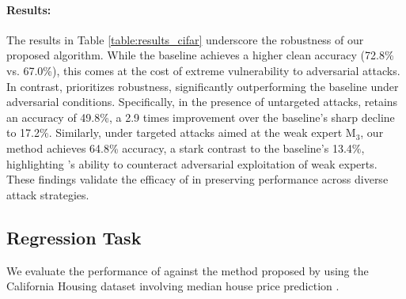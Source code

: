 \begin{table}[ht]\label{table:results_cifar}
\centering{}
\caption{Comparison of accuracy results between the proposed \name{} and the baseline \citep{mao2023twostage} on the CIFAR-100 validation set, including clean and adversarial scenarios.}
\end{table}
\paragraph{Results:} The results in Table \ref{table:results_cifar} underscore the robustness of our proposed \name{} algorithm. While the baseline achieves a higher clean accuracy (72.8\% vs. 67.0\%), this comes at the cost of extreme vulnerability to adversarial attacks. In contrast, \name{} prioritizes robustness, significantly outperforming the baseline under adversarial conditions. Specifically, in the presence of untargeted attacks, \name{} retains an accuracy of 49.8\%, a 2.9 times improvement over the baseline's sharp decline to 17.2\%. Similarly, under targeted attacks aimed at the weak expert M$_3$, our method achieves 64.8\% accuracy, a stark contrast to the baseline’s 13.4\%, highlighting \name{}’s ability to counteract adversarial exploitation of weak experts. These findings validate the efficacy of \name{} in preserving performance across diverse attack strategies.

\subsection{Regression Task}
We evaluate the performance of \name{} against the method proposed by \citet{mao2024regressionmultiexpertdeferral} using the California Housing dataset involving median house price prediction \citep{KELLEYPACE1997291}.


